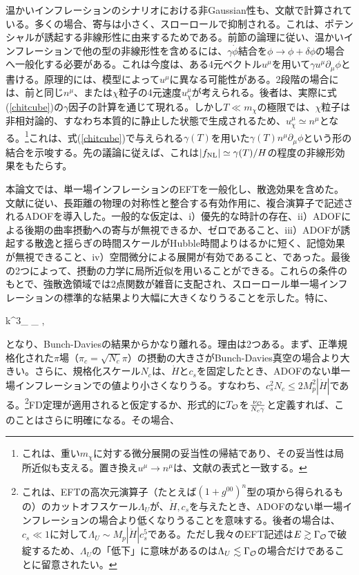 温かいインフレーションのシナリオにおける非Gaussian性も、文献で計算されている。多くの場合、寄与は小さく、スローロールで抑制される\cite{warmf1}。これは、ポテンシャルが誘起する非線形性に由来するためである。前節の論理に従い、温かいインフレーションで他の型の非線形性を含めるには、$\gamma\dot\phi$結合を$\phi\to\phi+\delta\phi$の場合へ一般化する必要がある。これは今度は、ある4元ベクトル$u^\mu$を用いて$\gamma u^\mu\partial_\mu\phi$と書ける。原理的には、模型によって$u^\mu$に異なる可能性がある。2段階の場合には、前と同じ$n^\mu$、または$\chi$粒子の4元速度$u_\chi^\mu$が考えられる。後者は、実際に式(\ref{chitcube})の$\gamma$因子の計算を通じて現れる。しかし$T\ll m_\chi$の極限では、$\chi$粒子は非相対論的、すなわち本質的に静止した状態で生成されるため、$u_\chi^\mu\simeq n^\mu$となる。\footnote{これは、重い$m_\chi$に対する微分展開の妥当性の帰結であり、その妥当性は局所近似も支える。置き換え$u^\mu\to n^\mu$は、文献\cite{berera11}の表式と一致する。}これは、式(\ref{chitcube})で与えられる$\gamma(T)$を用いた$\gamma(T)n^\mu\partial_\mu\phi$という形の結合を示唆する。先の議論に従えば、これは$|f_{\rm NL}|\simeq\gamma(T)/H$の程度の非線形効果をもたらす。


本論文では、単一場インフレーションのEFT\cite{eft1, Cheung:2007sv, Senatore:2009gt, Senatore:2009cf, Senatore:2010jy, Creminelli:2006xe, Bartolo:2010bj, Bartolo:2010di,dan2,strongc,dan2new}を一般化し、散逸効果を含めた。文献\cite{dis1,dis2}に従い、長距離の物理の対称性と整合する有効作用に、複合演算子で記述されるADOFを導入した。一般的な仮定は、i）優先的な時計の存在、ii）ADOFによる後期の曲率摂動への寄与が無視できるか、ゼロであること、iii）ADOFが誘起する散逸と揺らぎの時間スケールがHubble時間よりはるかに短く、記憶効果が無視できること、iv）空間微分による展開が有効であること、であった。最後の2つによって、摂動の力学に局所近似を用いることができる。これらの条件のもとで、強散逸領域では2点関数が雑音に支配され、スローロール単一場インフレーションの標準的な結果より大幅に大きくなりうることを示した。特に、

\beq
k^3\langle\zeta\zeta\rangle_{\calo} \simeq  {\nu_{\calo}}_\star {} ,
\eeq

となり、Bunch-Daviesの結果からかなり離れる。理由は2つある。まず、正準規格化された$\pi$場（$\pi_c=\sqrt{N_c}\pi$）の摂動の大きさがBunch-Davies真空の場合より大きい。さらに、規格化スケール$N_c$は、$\dot H$と$c_s$を固定したとき、ADOFのない単一場インフレーションでの値より小さくなりうる。すなわち、$c_s^2N_c\leq2M_p^2|\dot H|$である。\footnote{これは、EFTの高次元演算子（たとえば$(1+g^{00})^n$型の項から得られるもの）のカットオフスケール$\Lambda_U$が、$\dot H,c_s$を与えたとき、ADOFのない単一場インフレーションの場合より低くなりうることを意味する。後者の場合は、$c_s\ll1$に対して$\Lambda_U\sim M_p|\dot H|c_s^5$である\cite{eft1,dan2}。ただし我々のEFT記述は$E\gtrsim\Gamma_{\cal O}$で破綻するため、$\Lambda_U$の「低下」に意味があるのは$\Lambda_U\lesssim\Gamma_{\cal O}$の場合だけであることに留意されたい。}FD定理が適用されると仮定するか、形式的に$T_{\cal O}$を$\frac{\nu_{{\cal O}}}{N_c\gamma}$と定義すれば、このことはさらに明確になる。その場合、


